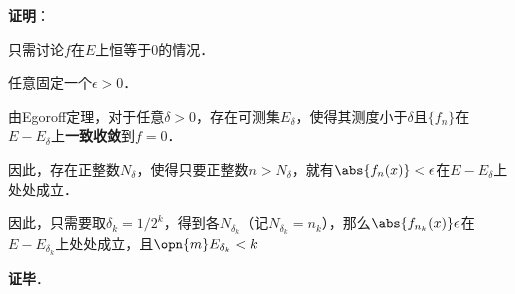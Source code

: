 \textbf{证明}：

只需讨论$f$在$E$上恒等于$0$的情况．

任意固定一个$\epsilon>0$．

由Egoroff定理，对于任意$\delta>0$，存在可测集$E_\delta$，使得其测度小于$\delta$且$\{f_n\}$在$E-E_\delta$上\textbf{一致收敛}到$f=0$．

因此，存在正整数$N_\delta$，使得只要正整数$n>N_\delta$，就有$\abs{f_n(x)}<\epsilon$在$E-E_\delta$上处处成立．

因此，只需要取$\delta_k=1/2^k$，得到各$N_{\delta_k}$（记$N_{\delta_k}=n_k$），那么$\abs{f_{n_k}(x)}\epsilon$在$E-E_{\delta_k}$上处处成立，且$\opn{m}E_{\delta_k}<k$

\textbf{证毕}．












